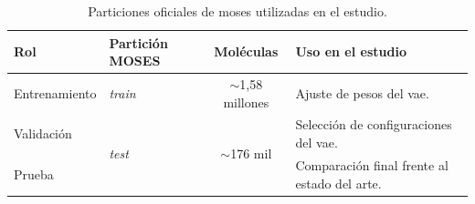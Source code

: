 \begin{table}[htbp]
\centering
\caption{Particiones oficiales de \acrshort{moses} utilizadas en el estudio.}
\label{tab:particiones_moses}
\begin{tabular}{llcp{5.5cm}}
\toprule
\textbf{Rol} & \textbf{Partición MOSES} & \textbf{Moléculas} & \textbf{Uso en el estudio} \\
\midrule
Entrenamiento & \textit{train} & $\sim$1,58 millones & Ajuste de pesos del \gls{vae}. \\
\midrule
Validación & \multirow{2}{*}{\textit{test}} & \multirow{2}{*}{$\sim$176 mil} & Selección de configuraciones del \gls{vae}. \\
Prueba & & & Comparación final frente al estado del arte. \\
\bottomrule
\end{tabular}
\end{table}
